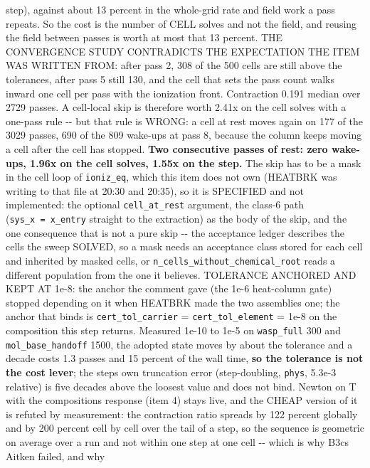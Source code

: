 \documentclass[english,a4paper]{my_memo}
\begin{document}
\begin{itemize}
  step), against about 13 percent in the whole-grid rate and field work a
  pass repeats. So the cost is the number of CELL solves and not the field,
  and reusing the field between passes is worth at most that 13 percent.
  THE CONVERGENCE STUDY CONTRADICTS THE EXPECTATION THE ITEM WAS WRITTEN
  FROM: after pass 2, 308 of the 500 cells are still above the tolerances,
  after pass 5 still 130, and the cell that sets the pass count walks inward
  one cell per pass with the ionization front. Contraction 0.191 median over
  2729 passes. A cell-local skip is therefore worth 2.41x on the cell solves
  with a one-pass rule -\/- but that rule is WRONG: a cell at rest moves again
  on 177 of the 3029 passes, 690 of the 809 wake-ups at pass 8, because the
  column keeps moving a cell after the cell has stopped. \textbf{Two consecutive
  passes of rest: zero wake-ups, 1.96x on the cell solves, 1.55x on the
  step.} The skip has to be a mask in the cell loop of \texttt{ioniz\_eq}, which
  this item does not own (HEATBRK was writing to that file at 20:30 and
  20:35), so it is SPECIFIED and not implemented: the optional
  \texttt{cell\_at\_rest} argument, the class-6 path (\texttt{sys\_x\ =\ x\_entry} straight to
  the extraction) as the body of the skip, and the one consequence that is
  not a pure skip -\/- the acceptance ledger describes the cells the sweep
  SOLVED, so a mask needs an acceptance class stored for each cell and inherited by
  masked cells, or \texttt{n\_cells\_without\_chemical\_root} reads a different
  population from the one it believes. TOLERANCE ANCHORED AND KEPT AT 1e-8:
  the anchor the comment gave (the 1e-6 heat-column gate) stopped depending
  on it when HEATBRK made the two assemblies one; the anchor that binds is
  \texttt{cert\_tol\_carrier} = \texttt{cert\_tol\_element} = 1e-8 on the composition this step
  returns. Measured 1e-10 to 1e-5 on \texttt{wasp\_full} 300 and \texttt{mol\_base\_handoff}
  1500, the adopted state moves by about the tolerance and a decade costs 1.3
  passes and 15 percent of the wall time, \textbf{so the tolerance is not the cost
  lever}; the step\textquotesingle s own truncation error (step-doubling, \texttt{phys}, 5.3e-3
  relative) is five decades above the loosest value and does not bind.
  Newton on T with the composition\textquotesingle s response (item 4) stays live, and the
  CHEAP version of it is refuted by measurement: the contraction ratio
  spreads by 122 percent globally and by 200 percent cell by cell over the tail
  of a step, so the sequence is geometric on average over a run and not
  within one step at one cell -\/- which is why B3c\textquotesingle s Aitken failed, and why

\end{itemize}
\end{document}
